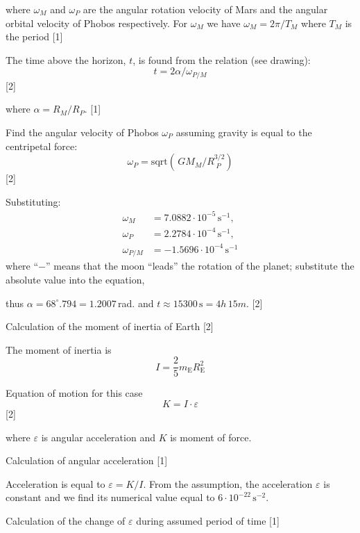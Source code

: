 where $\omega_M$ and $\omega_P$ are the angular rotation velocity of Mars and
the angular orbital velocity of Phobos respectively.
For $\omega_M$ we have $\omega_M = 2\pi/T_M$ where $T_M$ is the period \hfill[1]

The time above the horizon, $t$, is found from the relation (see drawing):
\[
  t = 2\alpha/\omega_{P/M}
\]
\hfill[2]

where $\alpha = R_M/R_P$.
\hfill[1]


Find the angular velocity of Phobos $\omega_P$ assuming gravity is equal to
the centripetal force:
\[
  \omega_P = \mathrm{sqrt}(\,GM_M/R^{3/2}_{\;P})
\]
\hfill[2]

Substituting:
\begin{align*}
  \omega_M &= 7.0882\cdot 10^{-5}\,\mathrm{s}^{-1}, \\
  \omega_P &= 2.2784\cdot 10^{-4}\,\mathrm{s}^{-1}, \\
  \omega_{P/M} &= -1.5696\cdot 10^{-4}\,\mathrm{s}^{-1}
\end{align*}
where ``$-$'' means that the moon ``leads'' the rotation of the planet;
substitute the absolute value into the equation,

thus
$\alpha = 68^\circ\!.794 = 1.2007$\,rad.
and $t \approx 15300\,\mathrm{s} = 4h\,15m$. \hfill[2]

Calculation of the moment of inertia of Earth \hfill[2]

The moment of inertia is
\[ I = \frac{2}{5} m_{\mathrm{E}} R_{\mathrm{E}}^2 \]

Equation of motion for this case
\[ K = I\cdot\varepsilon \]
\hfill[2]

where $\varepsilon$ is angular acceleration and $K$ is moment of force.

Calculation of angular acceleration \hfill[1]

Acceleration is equal to $\varepsilon = K/I$. From the assumption, the
acceleration $\varepsilon$ is constant and we find its numerical value equal
to $6\cdot10^{-22}\,\mathrm{s}^{-2}$. %

Calculation of the change of $\varepsilon$ during assumed period of time %
\hfill[1]

